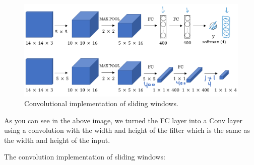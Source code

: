 \begin{figure}[!htbp]
    \centering
    \includegraphics[width=1.0\textwidth]{img/c4/sliding-window.png}
    \caption{Convolutional implementation of sliding windows.}
    \label{sliding-window}
\end{figure}

As you can see in the above image, we turned the FC layer into a Conv layer using a convolution with the width and height of the filter which is the same as the width and height of the input.

The convolution implementation of sliding windows:

